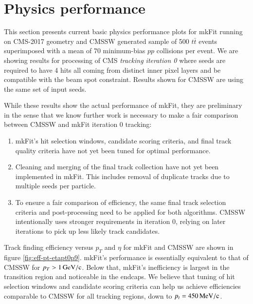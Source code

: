 \documentclass{webofc}
\def\mkfit{mkFit\xspace}
\def\MeVoc{\ensuremath{\,\rm{M}e\rm{V}/c}}
\def\GeVoc{\ensuremath{\,\rm{G}e\rm{V}/c}}
\begin{document}
\section{Physics performance}
\label{sec:phys-perf}

This section presents current basic physics performance plots for \mkfit
running on CMS-2017 geometry and CMSSW generated sample of 500 $t\bar{t}$
events superimposed with a mean of 70 minimum-bias $pp$ collisions per event. 
We are showing
results for processing of CMS \emph{tracking iteration 0} where seeds are
required to have 4 hits all coming from distinct inner pixel layers and be
compatible with the beam spot constraint. Results shown for CMSSW are using
the same set of input seeds.

While these results show the actual performance of \mkfit, they are
preliminary in the sense that we know further work is necessary to make a fair
comparison between CMSSW and \mkfit iteration 0 tracking:
\begin{enumerate}[--]\topsep-2pt\itemsep-2pt
\item \mkfit's hit selection windows, candidate scoring criteria, and final track
  quality criteria have not yet been tuned for optimal performance.
\item Cleaning and merging of the final track collection have not yet been
  implemented in \mkfit. This includes removal of duplicate tracks due to
  multiple seeds per particle.
\item To ensure a fair comparison of efficiency, the same final track selection
  criteria and post-processing need to be applied for both algorithms. CMSSW
  intentionally uses stronger requirements in iteration 0, relying on later
  iterations to pick up less likely track candidates.
\end{enumerate}

Track finding efficiency versus $p_T$ and $\eta$ for \mkfit and CMSSW are shown
in figure \ref{fig:eff-pt-etapt0p9}. \mkfit's performance is essentially
equivalent to that of CMSSW for $p_T > 1\GeVoc$. Below that, \mkfit's
inefficiency is largest in the transition region and noticeable in the
endcaps. We believe that tuning of hit selection windows and candidate scoring
criteria can help us achieve efficiencies comparable to CMSSW for all tracking
regions, down to $p_t = 450\MeVoc$.
\end{document}
